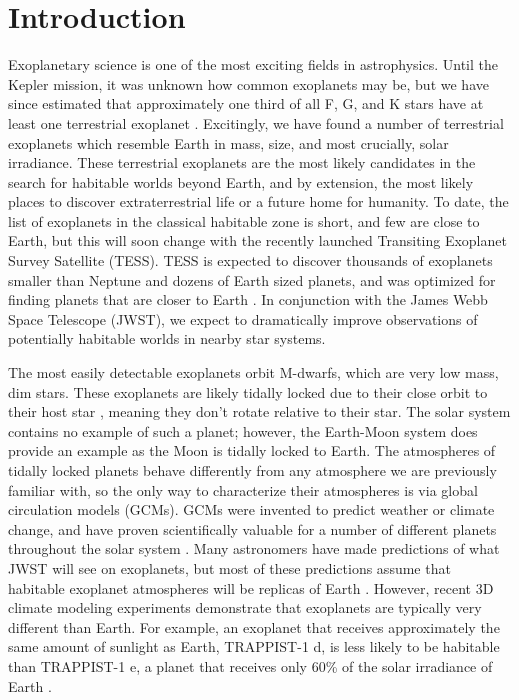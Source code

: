 \chapter{Introduction}
\label{introchap}
Exoplanetary science is one of the most exciting fields in astrophysics. Until
 the Kepler mission, it was unknown how
 common exoplanets may be, but we have since estimated that approximately one
 third of all F, G, and K stars have at least one terrestrial exoplanet
 \citep{nexoplanets}. Excitingly, we have found a number of terrestrial
 exoplanets which resemble Earth in mass, size, and most crucially, solar
 irradiance. These terrestrial exoplanets are the most likely candidates in the
 search for habitable worlds beyond Earth, and by extension, the most likely
 places to discover extraterrestrial life or a future home for humanity. To
 date, the list of exoplanets in the classical habitable zone is short, and few
 are close to Earth, but this will soon change with the recently launched
 Transiting Exoplanet Survey Satellite (TESS). TESS is expected to discover
 thousands of exoplanets smaller than Neptune and dozens of Earth sized planets,
 and was optimized for finding planets that are closer to Earth
 \citep{tesspredict}. In conjunction with the James Webb Space Telescope (JWST),
 we expect to dramatically improve observations of potentially habitable
 worlds in nearby star systems.

The most easily detectable exoplanets orbit M-dwarfs, which are very low mass,
 dim stars. These exoplanets are likely tidally locked due to their close orbit
 to their host star \citep{dynamicsfate}, meaning they don't rotate relative to
 their star. The solar system contains no example of such a planet; however, the
 Earth-Moon system does provide an example as the Moon is tidally locked to
 Earth. The
 atmospheres of tidally locked planets behave differently from any atmosphere
 we are previously
 familiar with, so the only way to characterize their atmospheres is via global
 circulation models (GCMs). GCMs were invented to predict
 weather or climate change, and have proven scientifically valuable for a number
 of different
 planets throughout the solar system \citep{venusgcm}. Many astronomers have
 made predictions of what JWST will see on exoplanets, but most of these
 predictions assume that habitable exoplanet atmospheres will be replicas of
 Earth \citep{ostproposal}. However, recent 3D climate modeling experiments
 demonstrate that exoplanets are typically very different than Earth. For
 example, an
 exoplanet that receives approximately the same amount of sunlight as Earth,
 TRAPPIST-1 d, is less likely to be habitable than TRAPPIST-1 e, a planet that
 receives only 60\% of the solar irradiance of Earth \citep{wolf18}.

